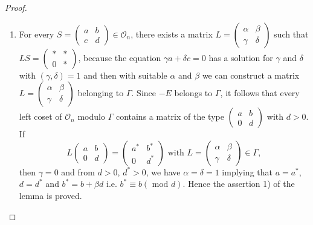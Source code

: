 \begin{proof}
\begin{enumerate}
\renewcommand{\labelenumi}{\theenumi)}
\item For every $S = \left(\begin{smallmatrix}
  a&b\\c&d \end{smallmatrix}\right)\in \mathcal{O}_n$, there
  exists a matrix $L=\left(\begin{smallmatrix} \alpha &\beta\\
\gamma &\delta  \end{smallmatrix}\right)$ such that $LS =
  \left(\begin{smallmatrix}
    \ast&\ast\\0&\ast \end{smallmatrix}\right)$, because the equation
  $\gamma a+ \delta c=0$ has a solution for $\gamma$ and $\delta$ with
  $(\gamma, \delta)=1$ and then with suitable $\alpha$ and $\beta$ we
  can construct a matrix $L=\left(\begin{smallmatrix} \alpha & \beta\\
\gamma & \delta \end{smallmatrix}\right)$ belonging to $\Gamma$. Since
  $-E$ belongs to $\Gamma$, it follows that every left coset of
  $\mathcal{O}_n$ modulo $\Gamma$ contains a matrix of the type
  $\left(\begin{smallmatrix} a&b\\0&d \end{smallmatrix}\right)$ with
  $d>0$. If 
$$
L \begin{pmatrix}
a&b\\0&d
\end{pmatrix} = \begin{pmatrix}
a^{\ast} & b^{\ast}\\
0 & d^{\ast} 
\end{pmatrix} \text{ with } L =
\left(\begin{smallmatrix} \alpha & \beta\\
\gamma & \delta 
 \end{smallmatrix}\right) \in \Gamma,
$$
then $\gamma=0$ and from $d>0$, $d^{\ast}>0$, we have
$\alpha=\delta=1$ implying that $a=a^{\ast}$, $d=d^{\ast}$ and
$b^{\ast} =b+\beta d$ i.e. $b^{\ast}\equiv b(\text{ mod } d)$. Hence the
assertion 1) of the lemma is proved.


\end{enumerate}
\end{proof}
